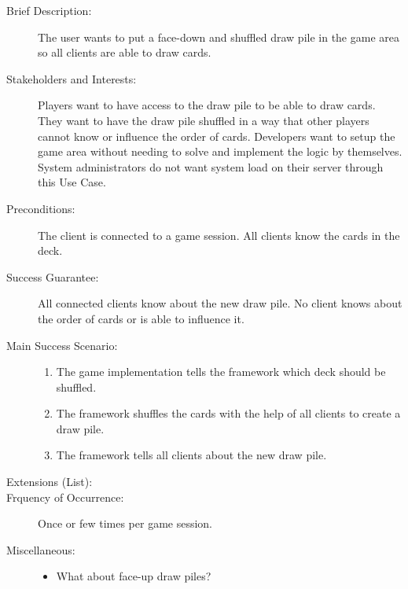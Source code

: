 \begin{description}
  \item[Brief Description:] The user wants to put a \gls{face}-down and shuffled
  \gls{draw pile} in the game area so all clients are able to draw cards.
  \item[Stakeholders and Interests:] Players want to have access to the
  \gls{draw pile} to be able to draw cards. They want to have the \gls{draw
  pile} shuffled in a way that other players cannot know or influence the order
  of cards. Developers want to setup the game area without needing to solve and
  implement the logic by themselves. System administrators do not want system
  load on their server through this Use Case.
  \item[Preconditions:] The client is connected to a game session. All clients
  know the cards in the \gls{deck}.
  \item[Success Guarantee:] All connected clients know about the new \gls{draw
  pile}. No client knows about the order of cards or is able to influence it.
  \item[Main Success Scenario:] \hfill
  \begin{enumerate}
    \item \label{itm:adddrawpile_telldeck} The game implementation tells the
    framework which \gls{deck} should be shuffled.
    \item The framework shuffles the cards with the help of all clients to
    create a \gls{draw pile}.
    \item The framework tells all clients about the new \gls{draw pile}.
  \end{enumerate}
  \item[Extensions (List):] \hfill
  \item[Frquency of Occurrence:] Once or few times per game session.
  \item[Miscellaneous:] \hfill
  \begin{itemize}
    \item What about \gls{face}-up \glspl{draw pile}?
  \end{itemize}
\end{description}

